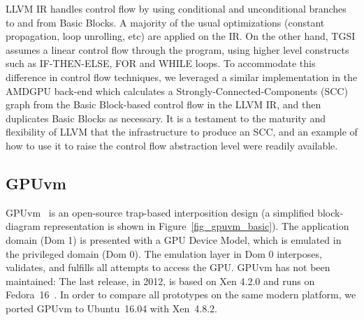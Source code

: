 LLVM IR handles control flow by using conditional and unconditional
branches to and from Basic Blocks. A majority of the usual
optimizations (constant propagation, loop unrolling, etc) are applied
on the IR. On the other hand, TGSI assumes a linear control flow
through the program, using higher level constructs such as
IF-THEN-ELSE, FOR and WHILE loops. To accommodate this difference in
control flow techniques, we leveraged a similar implementation in the
AMDGPU back-end which calculates a Strongly-Connected-Components (SCC)
graph from the Basic Block-based control flow in the LLVM IR, and then
duplicates Basic Blocks as necessary. It is a testament to the
maturity and flexibility of LLVM that the infrastructure to produce an
SCC, and an example of how to use it to raise the control flow
abstraction level were readily available.

\subsection{GPUvm}

GPUvm~\cite{GPUvm} is an open-source trap-based interposition design (a simplified block-diagram
representation is shown in Figure~\ref{fig_gpuvm_basic}).
The application domain (Dom 1) is presented with a GPU Device Model,
which is emulated in the privileged domain (Dom 0).
The emulation layer in Dom 0 interposes, validates, and fulfills
all attempts to access the GPU.
GPUvm has not been maintained: The last release, in 2012, is based on Xen 4.2.0
and runs on Fedora~16~\cite{yu2017fullvirt}. In order to compare all prototypes on
the same modern platform, we ported GPUvm to Ubuntu~16.04 with Xen~4.8.2.




